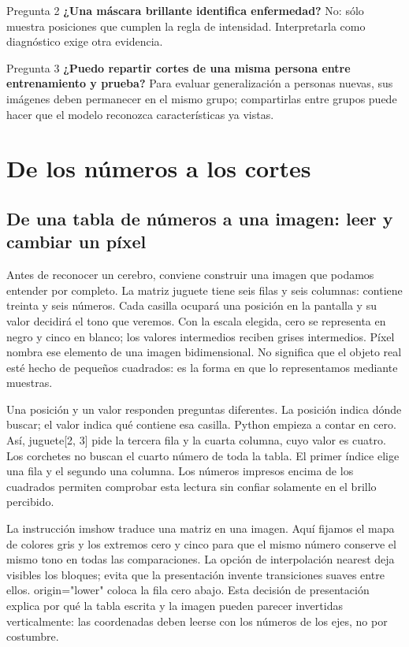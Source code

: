 \begin{Practica}{Pregunta 2}
\textbf{¿Una máscara brillante identifica enfermedad?} No: sólo muestra posiciones que cumplen la regla de intensidad. Interpretarla como diagnóstico exige otra evidencia.
\end{Practica}

\begin{Practica}{Pregunta 3}
\textbf{¿Puedo repartir cortes de una misma persona entre entrenamiento y prueba?} Para evaluar generalización a personas nuevas, sus imágenes deben permanecer en el mismo grupo; compartirlas entre grupos puede hacer que el modelo reconozca características ya vistas.
\end{Practica}

\chapter[Píxeles y cortes]{De los números a los cortes}

\label{cap:cortes}

\section{De una tabla de números a una imagen: leer y cambiar un píxel}


Antes de reconocer un cerebro, conviene construir una imagen que podamos entender por completo. La matriz juguete tiene seis filas y seis columnas: contiene treinta y seis números. Cada casilla ocupará una posición en la pantalla y su valor decidirá el tono que veremos. Con la escala elegida, cero se representa en negro y cinco en blanco; los valores intermedios reciben grises intermedios. Píxel nombra ese elemento de una imagen bidimensional. No significa que el objeto real esté hecho de pequeños cuadrados: es la forma en que lo representamos mediante muestras.


Una posición y un valor responden preguntas diferentes. La posición indica dónde buscar; el valor indica qué contiene esa casilla. Python empieza a contar en cero. Así, juguete[2, 3] pide la tercera fila y la cuarta columna, cuyo valor es cuatro. Los corchetes no buscan el cuarto número de toda la tabla. El primer índice elige una fila y el segundo una columna. Los números impresos encima de los cuadrados permiten comprobar esta lectura sin confiar solamente en el brillo percibido.


La instrucción imshow traduce una matriz en una imagen. Aquí fijamos el mapa de colores gris y los extremos cero y cinco para que el mismo número conserve el mismo tono en todas las comparaciones. La opción de interpolación nearest deja visibles los bloques; evita que la presentación invente transiciones suaves entre ellos. origin="lower" coloca la fila cero abajo. Esta decisión de presentación explica por qué la tabla escrita y la imagen pueden parecer invertidas verticalmente: las coordenadas deben leerse con los números de los ejes, no por costumbre.


